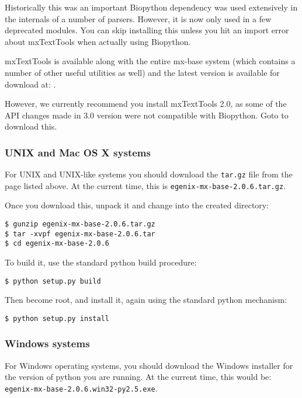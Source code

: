 \documentclass{article}
\begin{document}
Historically this was an important Biopython dependency was used
extensively in the internals of a number of parsers. However, it is now
only used in a few deprecated modules.  You can skip installing this
unless you hit an import error about mxTextTools when actually using Biopython.

mxTextTools is available along with the entire mx-base system (which
contains a number of other useful utilities as well) and the latest
version is available for download at:
.

However, we currently recommend you install mxTextTools 2.0, as some of
the API changes made in 3.0 version were not compatible with Biopython.  Goto 
to download this.

\subsubsection{UNIX and Mac OS X systems}

For UNIX and UNIX-like systems you should download the \verb|tar.gz|
file from the page listed above. At the current time, this is
\verb|egenix-mx-base-2.0.6.tar.gz|.

Once you download this, unpack it and change into the created directory:

\begin{verbatim}
$ gunzip egenix-mx-base-2.0.6.tar.gz 
$ tar -xvpf egenix-mx-base-2.0.6.tar
$ cd egenix-mx-base-2.0.6
\end{verbatim}

To build it, use the standard python build procedure:

\begin{verbatim}
$ python setup.py build
\end{verbatim}

Then become root, and install it, again using the standard python
mechanism:

\begin{verbatim}
$ python setup.py install
\end{verbatim}

\subsubsection{Windows systems}

For Windows operating systems, you should download the Windows installer
for the version of python you are running. At the current time, this
would be: \verb|egenix-mx-base-2.0.6.win32-py2.5.exe|.
\end{document}
